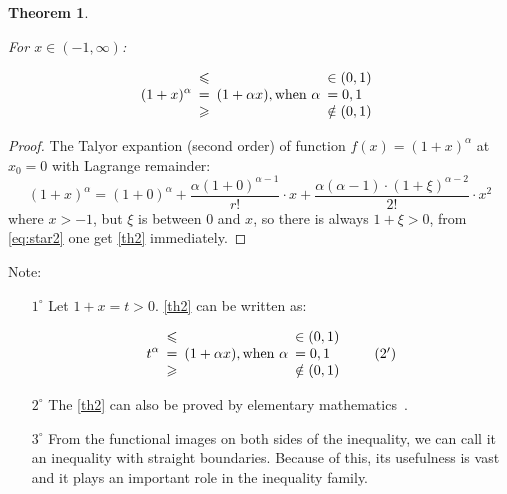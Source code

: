 \documentclass[12pt,a4paper,reqno]{amsart}
\theoremstyle{plain}
\newtheorem{Th}{Theorem}
\theoremstyle{definition}
\begin{document}
\begin{Th} \label{th2} 

  \textnormal{For} $x \in (-1, \infty)$: 

  \begin{equation}
    (1+x)^{\alpha}  \begin{array}{c}
      \leqslant \\ 
      = \\ 
      \geqslant  
    \end{array}
    (1+\alpha x), \textnormal{when}~\alpha 
    \begin{array}{l}
    \in (0,1) \\  
    = 0, 1 \\
    \notin(0, 1)     
    \end{array}
  \end{equation}
  
  \end{Th}
  
\begin{proof} The Talyor expantion (second order) of function $f(x) = (1+x)^{\alpha}$ at $x_0 = 0$ with Lagrange remainder: 
  \begin{equation}\label{eq:star2}
(1+x)^{\alpha} = (1+0)^{\alpha} + \frac{\alpha(1+0)^{\alpha-1}}{r!}\cdot x + \frac{\alpha(\alpha-1)\cdot(1+\xi)^{\alpha-2}}{2!}\cdot x^2 \tag{*2}    
  \end{equation}  
  where $x>-1$, but $\xi$ is between 0 and $x$, so there is always $1+\xi > 0$, from \eqref{eq:star2} one get \eqref{th2} immediately.  
\end{proof}

Note: 
\begin{enumerate}

  \item [$1^{\circ}$] Let $1+x=t > 0$. \eqref{th2} can be written as:  
  
  \begin{equation}\label{eq:2p}
    t^{\alpha}  \begin{array}{c}
      \leqslant \\ 
      = \\ 
      \geqslant  
    \end{array}
    (1+\alpha x), \textnormal{when}~\alpha 
    \begin{array}{l}
    \in (0,1) \\  
    = 0, 1 \\
    \notin(0, 1)     
    \end{array}
    \tag{$2^{\prime}$}
  \end{equation}


  \item [$2^{\circ}$] The \eqref{th2} can also be proved by elementary mathematics~\cite{shi1964}. 

  \item [$3^{\circ}$] From the functional images on both sides of the inequality, we can call it an inequality with straight boundaries. Because of this, its usefulness is vast and it plays an important role in the inequality family.

\end{enumerate}
\end{document}
